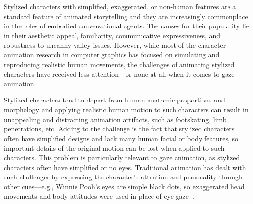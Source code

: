 Stylized characters with simplified, exaggerated, or non-human features are a standard feature of animated storytelling and they are increasingly commonplace in the roles of embodied conversational agents. The causes for their popularity lie in their aesthetic appeal, familiarity, communicative expressiveness, and robustness to uncanny valley issues. However, while most of the character animation research in computer graphics has focused on simulating and reproducing realistic human movements, the challenges of animating stylized characters have received less attention---or none at all when it comes to gaze animation.
%
%

Stylized characters tend to depart from human anatomic proportions and morphology and applying realistic human motion to such characters can result in unappealing and distracting animation artifacts, such as footskating, limb penetrations, etc. Adding to the challenge is the fact that stylized characters often have simplified designs and lack many human facial or body features, so important details of the original motion can be lost when applied to such characters. This problem is particularly relevant to gaze animation, as stylized characters often have simplified or no eyes. Traditional animation has dealt with such challenges by expressing the character's attention and personality through other cues---e.g., Winnie Pooh's eyes are simple black dots, so exaggerated head movements and body attitudes were used in place of eye gaze~\cite{thomas1981illusion}.

